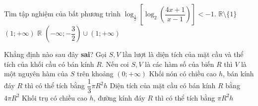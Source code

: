 \begin{ex}%
Tìm tập nghiệm của bất phương trình $ \log_{\frac{1}{2}} \left [ \log_2 \left ( \dfrac{4x + 1}{x - 1} \right ) \right ] < -1 $.	
	\choice
	{$ \mathbb{R} \setminus \{1\} $}
	{\True $ (1; + \infty) $}
	{$ \mathbb{R} $}
	{$ \left ( - \infty; - \dfrac{3}{2} \right ) \cup (1; + \infty) $}
\end{ex}	
\begin{ex}%
Khẳng định nào sau đây {\bf sai}?	
	\choice
	{ Gọi $ S, V $ lần lượt là diện tích của mặt cầu và thể tích của khối cầu có bán kính $ R $. Nếu coi $ S, V $ là các hàm số của biến $ R $ thì $ V $ là một nguyên hàm của $ S $ trên khoảng $ (0; + \infty) $}
	{Khối nón có chiều cao $ h $, bán kính đáy $ R $ thì có thể tích bằng $ \dfrac{1}{3}  \pi  R^2  h $}
	{ Diện tích của mặt cầu có bán kính $ R $ bằng $ 4 \pi  R^2 $}
	{\True Khối trụ có chiều cao $ h $, đường kính đáy $ R $ thì có thể tích bằng $ \pi  R^2  h $}
\end{ex}	
